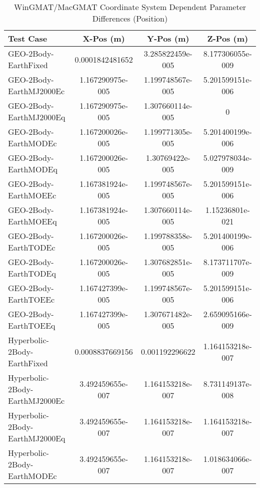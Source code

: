 \begin{table}[htbp!]
\centering
\caption{ WinGMAT/MacGMAT Coordinate System Dependent Parameter Differences (Position)}
      \begin{tabular}{lccc}
      \hline\hline
          Test Case & X-Pos (m) & Y-Pos (m) & Z-Pos (m) \\
         \hline
         GEO-2Body-EarthFixed & 0.0001842481652 & 3.285822459e-005 & 8.177306055e-009 \\
         GEO-2Body-EarthMJ2000Ec & 1.167290975e-005 & 1.199748567e-005 & 5.201599151e-006 \\
         GEO-2Body-EarthMJ2000Eq & 1.167290975e-005 & 1.307660114e-005 & 0 \\
         GEO-2Body-EarthMODEc & 1.167200026e-005 & 1.199771305e-005 & 5.201400199e-006 \\
         GEO-2Body-EarthMODEq & 1.167200026e-005 & 1.30769422e-005 & 5.027978034e-009 \\
         GEO-2Body-EarthMOEEc & 1.167381924e-005 & 1.199748567e-005 & 5.201599151e-006 \\
         GEO-2Body-EarthMOEEq & 1.167381924e-005 & 1.307660114e-005 & 1.15236801e-021 \\
         GEO-2Body-EarthTODEc & 1.167200026e-005 & 1.199788358e-005 & 5.201400199e-006 \\
         GEO-2Body-EarthTODEq & 1.167200026e-005 & 1.307682851e-005 & 8.173711707e-009 \\
         GEO-2Body-EarthTOEEc & 1.167427399e-005 & 1.199748567e-005 & 5.201599151e-006 \\
         GEO-2Body-EarthTOEEq & 1.167427399e-005 & 1.307671482e-005 & 2.659095166e-009 \\
         Hyperbolic-2Body-EarthFixed & 0.0008837669156 & 0.001192296622 & 1.164153218e-007 \\
         Hyperbolic-2Body-EarthMJ2000Ec & 3.492459655e-007 & 1.164153218e-007 & 8.731149137e-008 \\
         Hyperbolic-2Body-EarthMJ2000Eq & 3.492459655e-007 & 1.164153218e-007 & 1.164153218e-007 \\
         Hyperbolic-2Body-EarthMODEc & 3.492459655e-007 & 1.164153218e-007 & 1.018634066e-007 \\

\end{tabular}
\end{table}
